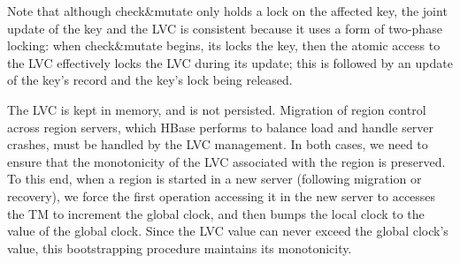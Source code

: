Note that although check\&mutate only holds a lock on the affected key, the joint update of the key and the LVC is consistent
because it uses a form of two-phase locking: when check\&mutate begins, its locks the key, then the atomic access to the LVC
effectively locks the LVC during its update; this is followed by an update of the key's record and the key's lock being released.

The LVC is kept in memory, and is not persisted. Migration of region control across region servers, which HBase performs 
to balance load and handle server crashes, must be handled by the LVC management. 
In both cases, we need to ensure that the monotonicity of the LVC associated with the %
region is preserved. To this end, when a region is started in a new server (following migration or recovery), 
we force the first operation accessing it
in the new server to accesses the TM to increment the global clock, and then 
bumps the local clock to the value of the global clock.
Since the LVC value can never exceed the global clock's value, this bootstrapping procedure maintains its monotonicity.



